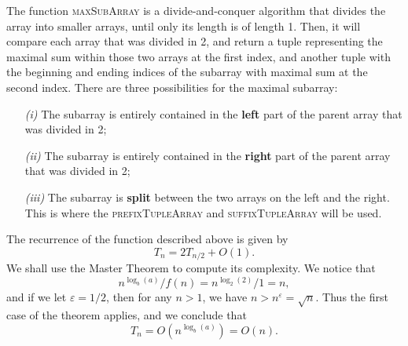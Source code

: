 \documentclass[12pt]{article}
\theoremstyle{definition}
\theoremstyle{remark}
\begin{document}
\begin{enumerate}
The function \textsc{maxSubArray} is a divide-and-conquer algorithm that divides the array into smaller arrays, until only its length is of length 1. Then, it will compare each array that was divided in 2, and return a tuple representing the maximal sum within those two arrays at the first index, and another tuple with the beginning and ending indices of the subarray with maximal sum at the second index. There are three possibilities for the maximal subarray: 
\begin{enumerate}
  \item[\it (i)] The subarray is entirely contained in the \textbf{left} part of the parent array that was divided in 2;
  \item[\it (ii)] The subarray is entirely contained in the \textbf{right} part of the parent array that was divided in 2;
  \item[\it (iii)] The subarray is \textbf{split} between the two arrays on the left and the right. This is where the  \textsc{prefixTupleArray} and \textsc{suffixTupleArray} will be used. 
\end{enumerate}
The recurrence of the function described above is given by 
$$T_n = 2T_{n/2} + O(1). $$
We shall use the Master Theorem to compute its complexity. We notice that 
$$n^{\log_b (a)} / f(n) = n^{\log_2(2)}/1 = n, $$
and if we let $\varepsilon = 1/2$, then for any $n > 1$, we have $n > n^\varepsilon = \sqrt{n} {}$. Thus the first case of the theorem applies, and we conclude that
$$T_n = O(n^{\log_b (a)}) = O(n) .$$

\end{enumerate}
\end{document}

